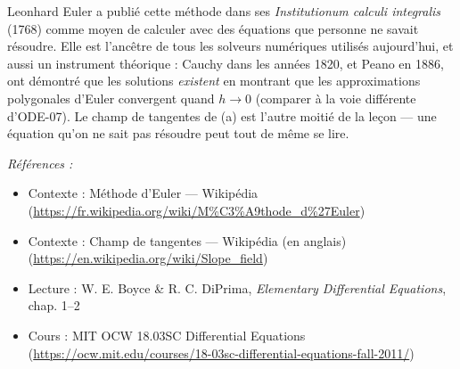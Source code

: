 \documentclass[11pt]{article}
\newenvironment{refs}{\par\small\noindent\emph{Références :}\begin{itemize}\setlength\itemsep{0pt}}{\end{itemize}\normalsize}
\begin{document}
\noindent Leonhard Euler a publié cette méthode dans ses \textit{Institutionum calculi
integralis} (1768) comme moyen de calculer avec des équations que personne ne savait résoudre.
Elle est l'ancêtre de tous les solveurs numériques utilisés aujourd'hui, et aussi un instrument
théorique : Cauchy dans les années 1820, et Peano en 1886, ont démontré que les solutions
\textit{existent} en montrant que les approximations polygonales d'Euler convergent quand
$ h \to 0 $ (comparer à la voie différente d'ODE-07). Le champ de tangentes de (a) est l'autre
moitié de la leçon --- une équation qu'on ne sait pas résoudre peut tout de même se lire.

\begin{refs}
\item Contexte : Méthode d'Euler --- Wikipédia (\url{https://fr.wikipedia.org/wiki/M%C3%A9thode_d%27Euler})
\item Contexte : Champ de tangentes --- Wikipédia (en anglais) (\url{https://en.wikipedia.org/wiki/Slope_field})
\item Lecture : W. E. Boyce \& R. C. DiPrima, \textit{Elementary Differential Equations}, chap. 1--2
\item Cours : MIT OCW 18.03SC Differential Equations (\url{https://ocw.mit.edu/courses/18-03sc-differential-equations-fall-2011/})
\end{refs}

\bigskip
\end{document}

